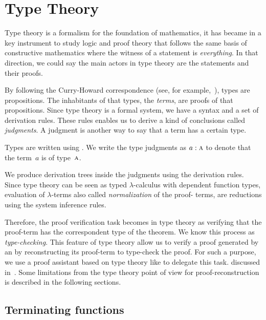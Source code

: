 \documentclass[../main.tex]{subfiles}
\begin{document}
\section{Type Theory}
\label{sec:type-theory}

Type theory is a formalism for the foundation of mathematics,
it has became in a key instrument to study logic and proof theory
that follows the same basis of constructive mathematics where the witness of a statement is \emph{everything}.
In that direction, we could say the main actors in type theory are the statements and their proofs.

By following the Curry-Howard correspondence (see, for
example,~\cite{Wadler-2015}), types are propositions. The inhabitants
of that types, the \emph{terms}, are proofs of that propositions.
Since type theory is a formal system, we have a syntax and a set of
derivation rules. These rules enables us to derive a kind of
conclusions called \emph{judgments}. A judgment is another way to say
that a term has a certain type.

\begin{notation}
  Types are written using .  We write the type
  judgments as $a : \textsc{a}$ to denote that the term~$a$ is of
  type~$\textsc{a}$.
\end{notation}

We produce derivation trees inside the judgments using the derivation
rules. Since type theory can be seen as typed $λ$-calculus with
dependent function types, evaluation of $λ$-terms also called
\emph{normalization} of the proof- terms, are reductions using the
system inference rules.

Therefore, the proof verification task becomes in type theory as
verifying that the proof-term has the correspondent type of the
theorem. We know this process as \emph{type-checking}.
This feature of type theory allow us to verify a proof generated by an \ATP by reconstructing its proof-term to type-check the proof. For such a
purpose, we use a proof assistant based on type theory like \Agda to
delegate this task. %
discussed in~\cite{Bezem2002}. Some limitations from the type theory
point of view for proof-reconstruction is described in the following
sections.


\subsection{Terminating functions}
\label{ssec:structural-recursion}
\end{document}

